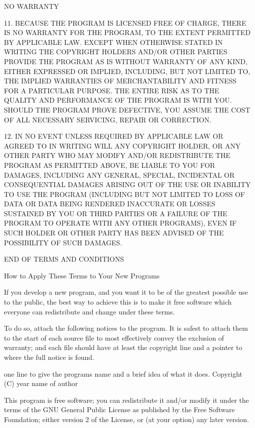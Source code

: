 \documentclass[letterpaper,10pt,english,openany,oneside]{sphinxmanual}
\begin{document}
\begin{sphinxVerbatim}[commandchars=\\\{\}]
                            NO WARRANTY

  11. BECAUSE THE PROGRAM IS LICENSED FREE OF CHARGE, THERE IS NO WARRANTY
FOR THE PROGRAM, TO THE EXTENT PERMITTED BY APPLICABLE LAW.  EXCEPT WHEN
OTHERWISE STATED IN WRITING THE COPYRIGHT HOLDERS AND/OR OTHER PARTIES
PROVIDE THE PROGRAM \PYGZdq{}AS IS\PYGZdq{} WITHOUT WARRANTY OF ANY KIND, EITHER EXPRESSED
OR IMPLIED, INCLUDING, BUT NOT LIMITED TO, THE IMPLIED WARRANTIES OF
MERCHANTABILITY AND FITNESS FOR A PARTICULAR PURPOSE.  THE ENTIRE RISK AS
TO THE QUALITY AND PERFORMANCE OF THE PROGRAM IS WITH YOU.  SHOULD THE
PROGRAM PROVE DEFECTIVE, YOU ASSUME THE COST OF ALL NECESSARY SERVICING,
REPAIR OR CORRECTION.

  12. IN NO EVENT UNLESS REQUIRED BY APPLICABLE LAW OR AGREED TO IN WRITING
WILL ANY COPYRIGHT HOLDER, OR ANY OTHER PARTY WHO MAY MODIFY AND/OR
REDISTRIBUTE THE PROGRAM AS PERMITTED ABOVE, BE LIABLE TO YOU FOR DAMAGES,
INCLUDING ANY GENERAL, SPECIAL, INCIDENTAL OR CONSEQUENTIAL DAMAGES ARISING
OUT OF THE USE OR INABILITY TO USE THE PROGRAM (INCLUDING BUT NOT LIMITED
TO LOSS OF DATA OR DATA BEING RENDERED INACCURATE OR LOSSES SUSTAINED BY
YOU OR THIRD PARTIES OR A FAILURE OF THE PROGRAM TO OPERATE WITH ANY OTHER
PROGRAMS), EVEN IF SUCH HOLDER OR OTHER PARTY HAS BEEN ADVISED OF THE
POSSIBILITY OF SUCH DAMAGES.

                     END OF TERMS AND CONDITIONS

            How to Apply These Terms to Your New Programs

  If you develop a new program, and you want it to be of the greatest
possible use to the public, the best way to achieve this is to make it
free software which everyone can redistribute and change under these terms.

  To do so, attach the following notices to the program.  It is safest
to attach them to the start of each source file to most effectively
convey the exclusion of warranty; and each file should have at least
the \PYGZdq{}copyright\PYGZdq{} line and a pointer to where the full notice is found.

    \PYGZlt{}one line to give the program\PYGZsq{}s name and a brief idea of what it does.\PYGZgt{}
    Copyright (C) \PYGZlt{}year\PYGZgt{}  \PYGZlt{}name of author\PYGZgt{}

    This program is free software; you can redistribute it and/or modify
    it under the terms of the GNU General Public License as published by
    the Free Software Foundation; either version 2 of the License, or
    (at your option) any later version.


\end{sphinxVerbatim}
\end{document}
